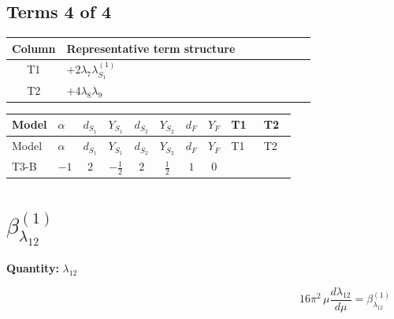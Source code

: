 \documentclass[8pt]{article}
\begin{document}
\begin{landscape}
\subsection*{Terms 4 of 4}
\begin{center}
\begin{tabular}{@{}c >{\raggedright\arraybackslash}p{0.82\linewidth}@{}}
\toprule
Column & Representative term structure \\
\midrule
T1 & \(\displaystyle +2 {\lambda_{7}} {\lambda_{S_1}^{(1)}}\) \\
\midrule
T2 & \(\displaystyle +4 {\lambda_{8}} {\lambda_{9}}\) \\
\midrule
\bottomrule
\end{tabular}
\end{center}
\smallskip
\tiny
\begin{longtable}{@{}llcccccc >{\raggedright\arraybackslash}p{0.21\linewidth} >{\raggedright\arraybackslash}p{0.21\linewidth}@{}}
\toprule
Model & $\alpha$ & $d_{S_1}$ & $Y_{S_1}$ & $d_{S_2}$ & $Y_{S_2}$ & $d_F$ & $Y_F$ & T1 & T2 \\
\midrule
\endfirsthead
\toprule
Model & $\alpha$ & $d_{S_1}$ & $Y_{S_1}$ & $d_{S_2}$ & $Y_{S_2}$ & $d_F$ & $Y_F$ & T1 & T2 \\
\midrule
\endhead
T3-B & $-1$ & $2$ & $-\frac{1}{2}$ & $2$ & $\frac{1}{2}$ & $1$ & $0$ & \scriptsize\adjustbox{max width=\linewidth}{$\begin{gathered} +2 {\lambda_{7}} {\lambda_{S_1}^{(1)}}\end{gathered}$} & \scriptsize\adjustbox{max width=\linewidth}{$\begin{gathered} +4 {\lambda_{8}} {\lambda_{9}}\end{gathered}$} \\
\midrule
\bottomrule
\end{longtable}
\clearpage
\section*{$\beta_{\lambda_{12}}^{(1)}$}
\noindent\textbf{Quantity: }$\lambda_{12}$\par\smallskip
\[16\pi^2\,\mu\frac{d \lambda_{12}}{d\mu}=\beta_{\lambda_{12}}^{(1)}\]

\end{landscape}
\end{document}
